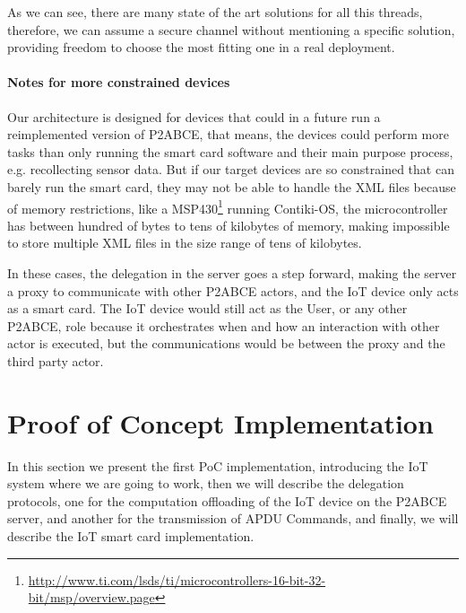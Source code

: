 \documentclass[journal]{IEEEtran}
\begin{document}
As we can see, there are many state of the art solutions for all this threads, therefore, we can assume a secure channel without mentioning a specific solution, providing freedom to choose the most fitting one in a real deployment.


\paragraph{Notes for more constrained devices}

Our architecture is designed for devices that could in a future run a reimplemented version of P2ABCE, that means, the devices could perform more tasks than only running the smart card software and their main purpose process, e.g. recollecting sensor data. But if our target devices are so constrained that can barely run the smart card, they may not be able to handle the XML files because of memory restrictions, like a MSP430\footnote{\url{http://www.ti.com/lsds/ti/microcontrollers-16-bit-32-bit/msp/overview.page}} running Contiki-OS, the microcontroller has between hundred of bytes to tens of kilobytes of memory, making impossible to store multiple XML files in the size range of tens of kilobytes.

In these cases, the delegation in the server goes a step forward, making the server a proxy to communicate with other P2ABCE actors, and the IoT device only acts as a smart card. The IoT device would still act as the User, or any other P2ABCE, role because it orchestrates when and how an interaction with other actor is executed, but the communications would be between the proxy and the third party actor. 



\section{Proof of Concept Implementation}\label{ch:implementation}
%
%  


In this section we present the first PoC implementation, introducing the IoT system where we are going to work, then we will describe the delegation protocols, one for the computation offloading of the IoT device on the P2ABCE server, and another for the transmission of APDU Commands, and finally, we will describe the IoT smart card implementation.
\end{document}
